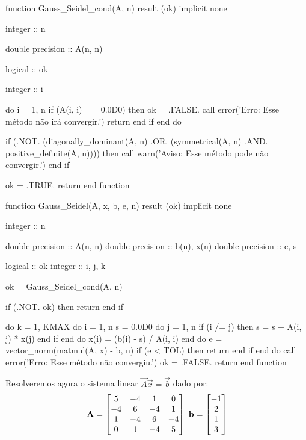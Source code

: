 \documentclass{homework}
\begin{document}
	\begin{fortran}
	function Gauss_Seidel_cond(A, n) result (ok)
		implicit none
		
		integer :: n
		
		double precision :: A(n, n)
		
		logical :: ok
		
		integer :: i
		
		do i = 1, n
			if (A(i, i) == 0.0D0) then
				ok = .FALSE.
				call error('Erro: Esse método não irá convergir.')
				return
			end if
		end do
		
		if (.NOT. (diagonally_dominant(A, n) .OR. (symmetrical(A, n) .AND. positive_definite(A, n)))) then
			call warn('Aviso: Esse método pode não convergir.')
		end if
		
		ok = .TRUE.
		return
	end function
	
	function Gauss_Seidel(A, x, b, e, n) result (ok)
		implicit none
		
		integer :: n
		
		double precision :: A(n, n)
		double precision :: b(n), x(n)
		double precision :: e, s
		
		logical :: ok
		integer :: i, j, k
		
		ok = Gauss_Seidel_cond(A, n)
		
		if (.NOT. ok) then
			return
		end if
		
		do k = 1, KMAX
			do i = 1, n
				s = 0.0D0
				do j = 1, n
					if (i /= j) then
						s = s + A(i, j) * x(j)
					end if
				end do
				x(i) = (b(i) - s) / A(i, i)
			end do
			e = vector_norm(matmul(A, x) - b, n)
			if (e < TOL) then
				return
			end if
		end do
		call error('Erro: Esse método não convergiu.')
		ok = .FALSE.
		return
	end function
	\end{fortran}	
	
	\quest%
	
	\subsubquest[] Resolveremos agora o sistema linear $\vec{A}\vec{x} = \vec{b}$ dado por:
	$$
		\vec{A} = \left[\begin{array}{@{}cccc@{}}
		 5 & -4 &  1 &  0 \\
		-4 &  6 & -4 &  1 \\
		 1 & -4 &  6 & -4 \\
		 0 &  1 & -4 &  5
		\end{array}\right]
		~
		\vec{b} = \left[\begin{array}{@{}c@{}}
		-1 \\
		 2 \\
		 1 \\
		 3 
		\end{array}\right]
	$$
	
\end{document}
